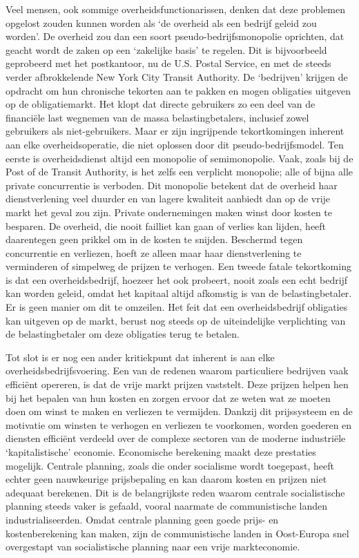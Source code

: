\documentclass[
  a5paper,
  smalldemyvopaper,10pt,twoside,onecolumn,openright,extrafontsizes,hidelinks]{memoir}
\begin{document}
Veel mensen, ook sommige overheidsfunctionarissen, denken dat deze
problemen opgelost zouden kunnen worden als `de overheid als een bedrijf
geleid zou worden'. De overheid zou dan een soort
pseudo-bedrijfsmonopolie oprichten, dat geacht wordt de zaken op een
`zakelijke basis' te regelen. Dit is bijvoorbeeld geprobeerd met het
postkantoor, nu de U.S. Postal Service, en met de steeds verder
afbrokkelende New York City Transit Authority. De `bedrijven' krijgen de
opdracht om hun chronische tekorten aan te pakken en mogen obligaties
uitgeven op de obligatiemarkt. Het klopt dat directe gebruikers zo een
deel van de financiële last wegnemen van de massa belastingbetalers,
inclusief zowel gebruikers als niet-gebruikers. Maar er zijn ingrijpende
tekortkomingen inherent aan elke overheidsoperatie, die niet oplossen
door dit pseudo-bedrijfsmodel. Ten eerste is overheidsdienst altijd een
monopolie of semimonopolie. Vaak, zoals bij de Post of de Transit
Authority, is het zelfs een verplicht monopolie; alle of bijna alle
private concurrentie is verboden. Dit monopolie betekent dat de overheid
haar dienstverlening veel duurder en van lagere kwaliteit aanbiedt dan
op de vrije markt het geval zou zijn. Private ondernemingen maken winst
door kosten te besparen. De overheid, die nooit failliet kan gaan of
verlies kan lijden, heeft daarentegen geen prikkel om in de kosten te
snijden. Beschermd tegen concurrentie en verliezen, hoeft ze alleen maar
haar dienstverlening te verminderen of simpelweg de prijzen te verhogen.
Een tweede fatale tekortkoming is dat een overheidsbedrijf, hoezeer het
ook probeert, nooit zoals een echt bedrijf kan worden geleid, omdat het
kapitaal altijd afkomstig is van de belastingbetaler. Er is geen manier
om dit te omzeilen. Het feit dat een overheidsbedrijf obligaties kan
uitgeven op de markt, berust nog steeds op de uiteindelijke verplichting
van de belastingbetaler om deze obligaties terug te betalen.

Tot slot is er nog een ander kritiekpunt dat inherent is aan elke
overheidsbedrijfsvoering. Een van de redenen waarom particuliere
bedrijven vaak efficiënt opereren, is dat de vrije markt prijzen
vaststelt. Deze prijzen helpen hen bij het bepalen van hun kosten en
zorgen ervoor dat ze weten wat ze moeten doen om winst te maken en
verliezen te vermijden. Dankzij dit prijssysteem en de motivatie om
winsten te verhogen en verliezen te voorkomen, worden goederen en
diensten efficiënt verdeeld over de complexe sectoren van de moderne
industriële `kapitalistische' economie. Economische berekening maakt
deze prestaties mogelijk. Centrale planning, zoals die onder socialisme
wordt toegepast, heeft echter geen nauwkeurige prijsbepaling en kan
daarom kosten en prijzen niet adequaat berekenen. Dit is de
belangrijkste reden waarom centrale socialistische planning steeds vaker
is gefaald, vooral naarmate de communistische landen industrialiseerden.
Omdat centrale planning geen goede prijs- en kostenberekening kan maken,
zijn de communistische landen in Oost-Europa snel overgestapt van
socialistische planning naar een vrije markteconomie.
\end{document}
